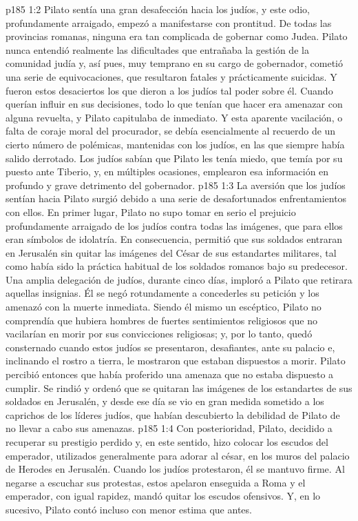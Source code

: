\vs p185 1:2 Pilato sentía una gran desafección hacia los judíos, y este odio, profundamente arraigado, empezó a manifestarse con prontitud. De todas las provincias romanas, ninguna era tan complicada de gobernar como Judea. Pilato nunca entendió realmente las dificultades que entrañaba la gestión de la comunidad judía y, así pues, muy temprano en su cargo de gobernador, cometió una serie de equivocaciones, que resultaron fatales y prácticamente suicidas. Y fueron estos desaciertos los que dieron a los judíos tal poder sobre él. Cuando querían influir en sus decisiones, todo lo que tenían que hacer era amenazar con alguna revuelta, y Pilato capitulaba de inmediato. Y esta aparente vacilación, o falta de coraje moral del procurador, se debía esencialmente al recuerdo de un cierto número de polémicas, mantenidas con los judíos, en las que siempre había salido derrotado. Los judíos sabían que Pilato les tenía miedo, que temía por su puesto ante Tiberio, y, en múltiples ocasiones, emplearon esa información en profundo y grave detrimento del gobernador.
\vs p185 1:3 La aversión que los judíos sentían hacia Pilato surgió debido a una serie de desafortunados enfrentamientos con ellos. En primer lugar, Pilato no supo tomar en serio el prejuicio profundamente arraigado de los judíos contra todas las imágenes, que para ellos eran símbolos de idolatría. En consecuencia, permitió que sus soldados entraran en Jerusalén sin quitar las imágenes del César de sus estandartes militares, tal como había sido la práctica habitual de los soldados romanos bajo su predecesor. Una amplia delegación de judíos, durante cinco días, imploró a Pilato que retirara aquellas insignias. Él se negó rotundamente a concederles su petición y los amenazó con la muerte inmediata. Siendo él mismo un escéptico, Pilato no comprendía que hubiera hombres de fuertes sentimientos religiosos que no vacilarían en morir por sus convicciones religiosas; y, por lo tanto, quedó consternado cuando estos judíos se presentaron, desafiantes, ante su palacio e, inclinando el rostro a tierra, le mostraron que estaban dispuestos a morir. Pilato percibió entonces que había proferido una amenaza que no estaba dispuesto a cumplir. Se rindió y ordenó que se quitaran las imágenes de los estandartes de sus soldados en Jerusalén, y desde ese día se vio en gran medida sometido a los caprichos de los líderes judíos, que habían descubierto la debilidad de Pilato de no llevar a cabo sus amenazas.
\vs p185 1:4 Con posterioridad, Pilato, decidido a recuperar su prestigio perdido y, en este sentido, hizo colocar los escudos del emperador, utilizados generalmente para adorar al césar, en los muros del palacio de Herodes en Jerusalén. Cuando los judíos protestaron, él se mantuvo firme. Al negarse a escuchar sus protestas, estos apelaron enseguida a Roma y el emperador, con igual rapidez, mandó quitar los escudos ofensivos. Y, en lo sucesivo, Pilato contó incluso con menor estima que antes.

